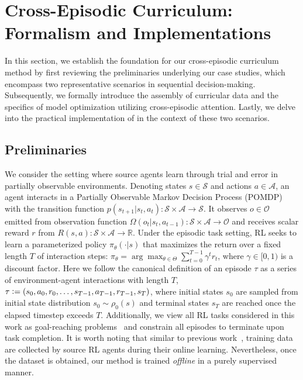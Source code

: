 \section{Cross-Episodic Curriculum: Formalism and Implementations}
\label{sec:method}
In this section, we establish the foundation for our cross-episodic curriculum method by first reviewing the preliminaries underlying our case studies, which encompass two representative scenarios in sequential decision-making. Subsequently, we formally introduce the assembly of curricular data and the specifics of model optimization utilizing cross-episodic attention. Lastly, we delve into the practical implementation of \cec in the context of these two scenarios.

\subsection{Preliminaries}
We consider the setting where source agents learn through trial and error in partially observable environments.
Denoting states $s \in \mathcal{S}$ and actions $a \in \mathcal{A}$, an agent interacts in a Partially Observable Markov Decision Process (POMDP) with the transition function $p(s_{t + 1} \vert s_t, a_t): \mathcal{S} \times \mathcal{A} \rightarrow \mathcal{S}$. It observes $o \in \mathcal{O}$ emitted from observation function $\Omega(o_t \vert s_t, a_{t - 1}): \mathcal{S} \times \mathcal{A} \rightarrow \mathcal{O}$ and receives scalar reward $r$ from $R (s, a): \mathcal{S} \times \mathcal{A} \rightarrow \mathbb{R}$.
Under the episodic task setting,
RL seeks to learn a parameterized policy $\pi_\theta (\cdot \vert s)$ that maximizes the return over a fixed length $T$ of interaction steps: $\pi_\theta = \arg \max_{\theta \in \Theta} \sum_{t = 0}^{T - 1} \gamma^t r_t$, where $\gamma \in [0, 1)$ is a discount factor.
Here we follow the canonical definition of an episode $\tau$ as a series of environment-agent interactions with length $T$, $\tau \vcentcolon= (s_0, a_0, r_0, \ldots, s_{T - 1}, a_{T - 1}, r_{T - 1}, s_T)$, where initial states $s_0$ are sampled from initial state distribution $s_0 \sim \rho_0(s)$ and terminal states $s_T$ are reached once the elapsed timestep exceeds $T$.
Additionally, we view all RL tasks considered in this work as goal-reaching problems~\citep{Kaelbling1993LearningTA,ghosh2019learning} and constrain all episodes to terminate upon task completion.
It is worth noting that similar to previous work~\citep{laskin2023incontext}, training data are collected by source RL agents during their online learning. Nevertheless, once the dataset is obtained, our method is trained \emph{offline} in a purely supervised manner.

